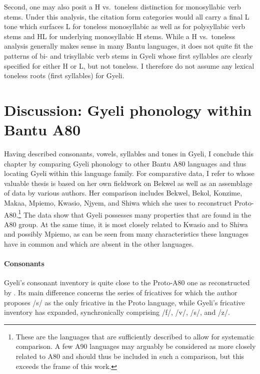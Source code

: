 Second, one may also posit a H vs.\ toneless distinction for monosyllabic verb stems. Under this analysis, the citation form categories would all carry a final L tone which surfaces L for toneless monosyllabic as well as for polysyllabic verb stems and HL for underlying monosyllabic H stems. While a H vs.\ toneless analysis generally makes sense in many Bantu languages, it does not quite fit the patterns of bi- and trisyllabic verb stems in Gyeli whose first syllables are clearly specified for either H or L, but not toneless. I therefore do not assume any lexical toneless roots (first syllables) for Gyeli.




\section[Discussion: Bantu A80 phonology]{Discussion: Gyeli phonology within Bantu A80}
\label{sec:PhonA80}

Having described consonants, vowels, syllables and tones in Gyeli, I conclude this chapter by comparing Gyeli phonology to other Bantu A80 languages and thus locating Gyeli within this language family. For comparative data, I refer to \citet{cheucle2014} whose valuable thesis is based on her own fieldwork on Bekwel as well as an assemblage of data by various authors. Her comparison includes Bekwel, Bekol, Konzime, Makaa, Mpiemo, Kwasio, Njyem, and Shiwa which she uses to reconstruct Proto-A80.\footnote{These are the languages that are sufficiently described to allow for  systematic comparison. A few A90 languages may arguably be considered as more closely related to A80 and should thus be included in such a comparison, but this exceeds the frame of this work.} The data show that Gyeli possesses many properties that are found in the A80 group. At the same time, it is most closely related to Kwasio and to Shiwa and possibly Mpiemo, as can be seen from many characteristics these languages have in common and which are absent in the other languages.

\paragraph{Consonants} Gyeli's consonant inventory is quite close to the Proto-A80 one as reconstructed by \citet[432]{cheucle2014}. Its main difference concerns the series of fricatives for which the author proposes /s/ as the only fricative in the Proto language, while Gyeli's fricative inventory has expanded, synchronically comprising /f/, /v/, /s/, and /z/.

